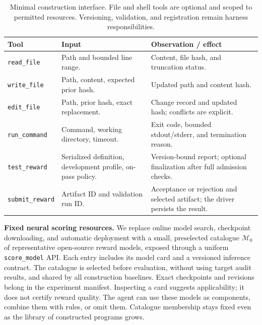 \begin{table}[t]
\centering
\caption{Minimal construction interface. File and shell tools are optional and scoped to permitted resources. Versioning, validation, and registration remain harness responsibilities.}
\label{tab:construction_tools}
\small
\begin{tabularx}{\linewidth}{@{}lXX@{}}
\toprule
\textbf{Tool} & \textbf{Input} & \textbf{Observation / effect} \\
\midrule
\texttt{read\_file} & Path and bounded line range. & Content, file hash, and truncation status. \\
\texttt{write\_file} & Path, content, expected prior hash. & Updated path and content hash. \\
\texttt{edit\_file} & Path, prior hash, exact replacement. & Change record and updated hash; conflicts are explicit. \\
\texttt{run\_command} & Command, working directory, timeout. & Exit code, bounded stdout/stderr, and termination reason. \\
\texttt{test\_reward} & Serialized definition, development profile, on-pass policy. & Version-bound report; optional finalization after full admission checks. \\
\texttt{submit\_reward} & Artifact ID and validation run ID. & Acceptance or rejection and selected artifact; the driver persists the result. \\
\bottomrule
\end{tabularx}
\end{table}

\noindent\textbf{Fixed neural scoring resources.} We replace online model search, checkpoint downloading, and automatic deployment with a small, preselected catalogue $\mathcal M_0$ of representative open-source reward models, exposed through a uniform \texttt{score\_model} API. Each entry includes its model card and a versioned inference contract. The catalogue is selected before evaluation, without using target audit results, and shared by all construction baselines. Exact checkpoints and revisions belong in the experiment manifest. Inspecting a card suggests applicability; it does not certify reward quality. The agent can use these models as components, combine them with rules, or omit them. Catalogue membership stays fixed even as the library of constructed programs grows.

